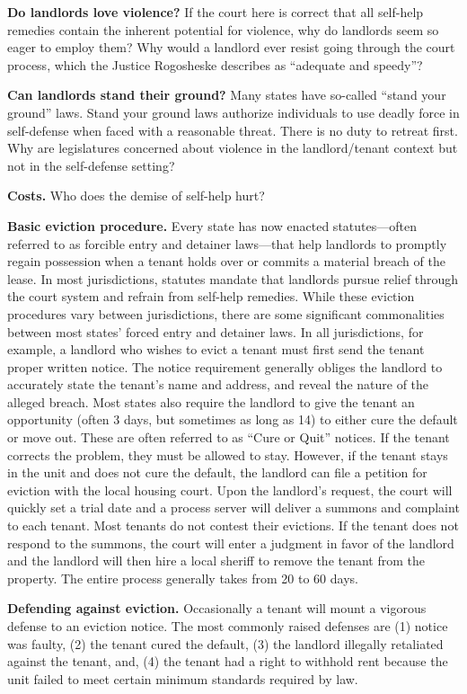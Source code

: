 \item \textbf{Do landlords love violence?} If the court here is correct that all
self-help remedies contain the inherent potential for violence, why do
landlords seem so eager to employ them? Why would a landlord ever resist going
through the court process, which the Justice Rogosheske describes as ``adequate
and speedy''?


\item \textbf{Can landlords stand their ground?} Many states have
so-called ``stand your ground'' laws.  Stand your ground laws authorize
individuals to use deadly force in self-defense when faced with a reasonable
threat.  There is no duty to retreat first.  Why are legislatures concerned
about violence in the landlord/tenant context but not in the self-defense
setting? 


\item \textbf{Costs.} Who does the demise of self-help hurt?


\item \textbf{Basic eviction procedure.} Every state has now enacted
statutes---often referred to as forcible entry and detainer laws---that help
landlords to promptly regain possession when a tenant holds over or commits a
material breach of the lease.  In most jurisdictions, statutes mandate that
landlords pursue relief through the court system and refrain from self-help
remedies.  While these eviction procedures vary between jurisdictions, there
are some significant commonalities between most states' forced entry and
detainer laws.  In all jurisdictions, for example, a landlord who wishes to
evict a tenant must first send the tenant proper written notice.  The notice
requirement generally obliges the landlord to accurately state the tenant's
name and address, and reveal the nature of the alleged breach.  Most states
also require the landlord to give the tenant an opportunity (often 3 days, but
sometimes as long as 14) to either cure the default or move out.  These are
often referred to as ``Cure or Quit'' notices.  If the tenant corrects the
problem, they must be allowed to stay.  However, if the tenant stays in the
unit and does not cure the default, the landlord can file a petition for
eviction with the local housing court.  Upon the landlord's request, the court
will quickly set a trial date and a process server will deliver a summons and
complaint to each tenant.  Most tenants do not contest their evictions.  If the
tenant does not respond to the summons, the court will enter a judgment in
favor of the landlord and the landlord will then hire a local sheriff to remove
the tenant from the property.  The entire process generally takes from 20 to 60
days. 


\item \textbf{Defending against eviction.} Occasionally a tenant will mount a
vigorous defense to an eviction notice.  The most commonly raised defenses are
(1) notice was faulty, (2) the tenant cured the default, (3) the landlord
illegally retaliated against the tenant, and, (4) the tenant had a right to
withhold rent because the unit failed to meet certain minimum standards
required by law. 

